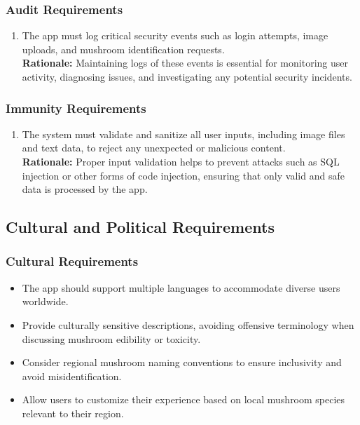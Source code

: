 \documentclass[]{article}
\begin{document}
\subsubsection{Audit Requirements}
\label{ssub:audit_requirements}
\begin{enumerate}[{SR-AU}1. ]
	\item The app must log critical security events such as login attempts, image uploads, and mushroom identification requests.\\
	\textbf{Rationale:} Maintaining logs of these events is essential for monitoring user activity, diagnosing issues, and investigating any potential security incidents.
\end{enumerate}

\subsubsection{Immunity Requirements}
\label{ssub:immunity_requirements}
\begin{enumerate}[{SR-IM}1. ]
	\item The system must validate and sanitize all user inputs, including image files and text data, to reject any unexpected or malicious content.\\
	\textbf{Rationale:} Proper input validation helps to prevent attacks such as SQL injection or other forms of code injection, ensuring that only valid and safe data is processed by the app.
\end{enumerate}

\subsection{Cultural and Political Requirements}
\subsubsection{Cultural Requirements}
\begin{itemize}
    \item The app should support multiple languages to accommodate diverse users worldwide.
    \item Provide culturally sensitive descriptions, avoiding offensive terminology when discussing mushroom edibility or toxicity.
    \item Consider regional mushroom naming conventions to ensure inclusivity and avoid misidentification.
    \item Allow users to customize their experience based on local mushroom species relevant to their region.
\end{itemize}
\end{document}
